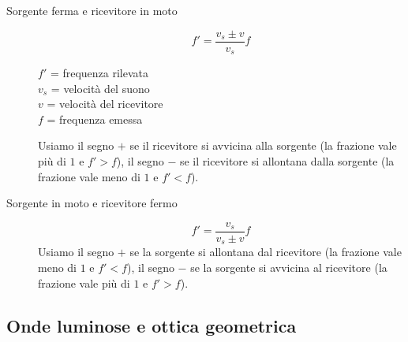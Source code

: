 \documentclass[a4paper,11pt,italian]{article}
\begin{document}
\begin{description}
  \item[Sorgente ferma e ricevitore in moto]
  \[ f' = \frac{v_s \pm  v}{v_s}f \]
  \begin{multicols}{2}
  $ f' $ = frequenza rilevata\\
  $ v_s $ = velocità del suono\\
  $ v $ = velocità del ricevitore\\
  $ f $ = frequenza emessa
  \end{multicols}
  
  Usiamo il segno $ + $ se il ricevitore si avvicina alla sorgente (la frazione vale più di $ 1 $ e $ f' > f $), il segno $ - $ se il ricevitore si allontana dalla sorgente (la frazione vale meno di $ 1 $ e $ f' < f $).
  
  \item[Sorgente in moto e ricevitore fermo]
  \[ f' = \frac{v_s }{v_s \pm  v}f \]
  Usiamo il segno $ + $ se la sorgente si allontana dal ricevitore (la frazione vale meno di $ 1 $ e $ f' < f $), il segno $ - $ se la sorgente si avvicina al ricevitore (la frazione vale più di $ 1 $ e $ f' > f $).
\end{description}



\subsection{Onde luminose e ottica geometrica}
\end{document}
